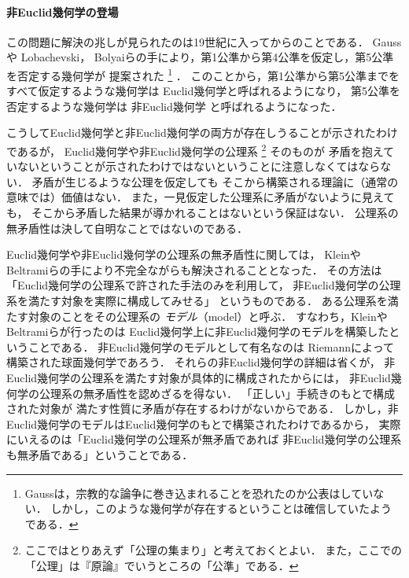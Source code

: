  \paragraph{非Euclid幾何学の登場}
  この問題に解決の兆しが見られたのは19世紀に入ってからのことである．
  Gaussや
  Lobachevski，
  Bolyaiらの手により，第1公準から第4公準を仮定し，第5公準を否定する幾何学が
  提案された
  \footnote{Gaussは，宗教的な論争に巻き込まれることを恐れたのか公表はしていない．
  しかし，このような幾何学が存在するということは確信していたようである．}
  ．
  このことから，第1公準から第5公準までを
  すべて仮定するような幾何学は
  Euclid幾何学と呼ばれるようになり，
  第5公準を否定するような幾何学は
  非Euclid幾何学
  と呼ばれるようになった．

  こうしてEuclid幾何学と非Euclid幾何学の両方が存在しうることが示されたわけであるが，
  Euclid幾何学や非Euclid幾何学の公理系
  \footnote{ここではとりあえず「公理の集まり」と考えておくとよい．
  また，ここでの「公理」は『原論』でいうところの「公準」である．}
  そのものが
  矛盾を抱えていないということが示されたわけではないということに注意しなくてはならない．
  矛盾が生じるような公理を仮定しても
  そこから構築される理論に（通常の意味では）価値はない．
  また，一見仮定した公理系に矛盾がないように見えても，
  そこから矛盾した結果が導かれることはないという保証はない．
  公理系の無矛盾性は決して自明なことではないのである．

  Euclid幾何学や非Euclid幾何学の公理系の無矛盾性に関しては，
  Kleinや
  Beltramiらの手により不完全ながらも解決されることとなった．
  その方法は「Euclid幾何学の公理系で許された手法のみを利用して，
  非Euclid幾何学の公理系を満たす対象を実際に構成してみせる」
  というものである．
  ある公理系を満たす対象のことをその公理系の
  \emph{モデル}（model）と呼ぶ．
  すなわち，KleinやBeltramiらが行ったのは
  Euclid幾何学上に非Euclid幾何学のモデルを構築したということである．
  非Euclid幾何学のモデルとして有名なのは
  Riemannによって構築された球面幾何学であろう．
  それらの非Euclid幾何学の詳細は省くが，
  非Euclid幾何学の公理系を満たす対象が具体的に構成されたからには，
  非Euclid幾何学の公理系の無矛盾性を認めざるを得ない．
  「正しい」手続きのもとで構成された対象が
  満たす性質に矛盾が存在するわけがないからである．
  しかし，非Euclid幾何学のモデルはEuclid幾何学のもとで構築されたわけであるから，
  実際にいえるのは「Euclid幾何学の公理系が無矛盾であれば
  非Euclid幾何学の公理系も無矛盾である」ということである．

